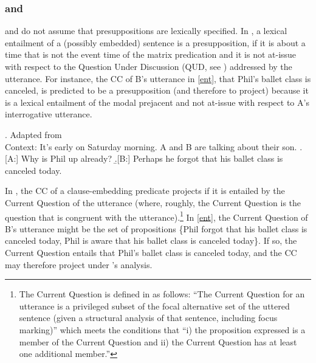 \documentclass[a4paper,12pt,twoside]{article}
\newcommand{\poscite}[1]{\citeauthor{#1}'s \citeyear{#1}}
\begin{document}
	

\subsubsection{\citealt{abrusan_predicting_2011} and \citealt*{simons_best_2017}}\label{s:abrusan}

    \citet{abrusan_predicting_2011} and \citet{simons_best_2017} do not assume that presuppositions are lexically specified. In \citealt{abrusan_predicting_2011}, a lexical entailment of a (possibly embedded) sentence is a presupposition, if it is about a time that is not the event time of the matrix predication and it is not at-issue with respect to the Question Under Discussion (QUD, see \citealt{roberts_information_2012}) addressed by the utterance. For instance, the CC of B's utterance in \ref{ent}, that Phil's ballet class is canceled, is predicted to be a presupposition (and therefore to project) because it is a lexical entailment of the modal prejacent and not at-issue with respect to A's interrogative utterance.
    
    \ex.\label{ent} Adapted from \citealt[188]{simons_best_2017} \\ Context: It's early on Saturday morning. A and B are talking about their son. 
    \a.[A:] Why is Phil up already?
    \b.[B:] Perhaps he forgot that his ballet class is canceled today. 

    In \citealt{simons_best_2017}, the CC of a clause-embedding predicate projects if it is entailed by the Current Question of the utterance (where, roughly, the Current Question is the question that is congruent with the utterance).\footnote{The Current Question is defined in \citealt[194]{simons_best_2017} as follows: ``The Current Question for an utterance is a privileged subset of the focal alternative set of the uttered sentence (given a structural analysis of that sentence, including focus marking)'' which meets the conditions that ``i) the proposition expressed is a member of the Current Question and ii) the Current Question has at least one additional member.''} In \ref{ent},  the Current Question of B's utterance might be the set of propositions \{Phil forgot that his ballet class is canceled today, Phil is aware that his ballet class is canceled today\}. If so, the Current Question entails that Phil's ballet class is canceled today, and the CC may therefore project under \poscite{simons_best_2017} analysis.
  
\end{document}
